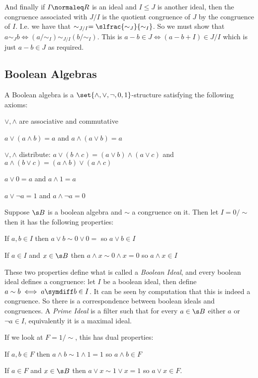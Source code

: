 And finally if $I\normaleq R$ is an ideal and $I\leq J$ is another ideal, then the congruence associated with $J/I$ is the quotient congruence of $J$ by the congruence of $I$.
I.e. we have that $\sim_{J/I}=\slfrac{\sim_J}{\sim_I}$.
So we must show that $a\sim_Jb\iff(a/{\sim_I})\sim_{J/I}(b/{\sim_I})$.
This is $a-b\in J\iff (a-b+I)\in J/I$ which is just $a-b\in J$ as required.

\subsection{Boolean Algebras}

\bdefn

    A {\emphcolor Boolean algebra} is a $\set{\wedge,\vee,\neg,0,1}$-structure satisfying the following axioms:
    \benum
        \item $\vee,\wedge$ are associative and commutative
        \item $a\vee(a\wedge b)=a$ and $a\wedge(a\vee b)=a$
        \item $\vee,\wedge$ distribute: $a\vee(b\wedge c)=(a\vee b)\wedge(a\vee c)$ and $a\wedge(b\vee c)=(a\wedge b)\vee(a\wedge c)$
        \item $a\vee0=a$ and $a\wedge1=a$
        \item $a\vee\neg a=1$ and $a\wedge\neg a=0$
    \eenum

\edefn

Suppose $\s B$ is a boolean algebra and $\sim$ a congruence on it.
Then let $I=0/{\sim}$ then it has the following properties:
\benum
    \item If $a,b\in I$ then $a\vee b\sim0\vee0=$ so $a\vee b\in I$
    \item If $a\in I$ and $x\in\s B$ then $a\wedge x\sim0\wedge x=0$ so $a\wedge x\in I$
\eenum

These two properties define what is called a {\it Boolean Ideal}, and every boolean ideal defines a congruence: let $I$ be a boolean ideal, then define $a\sim b\iff a\symdiff b\in I$.
It can be seen by computation that this is indeed a congruence.
So there is a correspondence between boolean ideals and congruences.
A {\it Prime Ideal} is a filter such that for every $a\in\s B$ either $a$ or $\neg a\in I$, equivalently it is a maximal ideal.

If we look at $F=1/{\sim}$, this has dual properties:
\benum
    \item If $a,b\in F$ then $a\wedge b\sim1\wedge1=1$ so $a\wedge b\in F$
    \item If $a\in F$ and $x\in\s B$ then $a\vee x\sim1\vee x=1$ so $a\vee x\in F$.
\eenum

